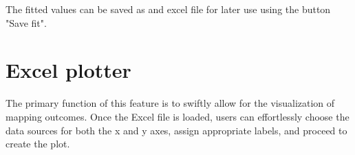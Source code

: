 The fitted values can be saved as and excel file for later use using the button "Save fit".

\section{Excel plotter}
The primary function of this feature is to swiftly allow for the visualization of mapping outcomes. Once the Excel file is loaded, users can effortlessly choose the data sources for both the x and y axes, assign appropriate labels, and proceed to create the plot.